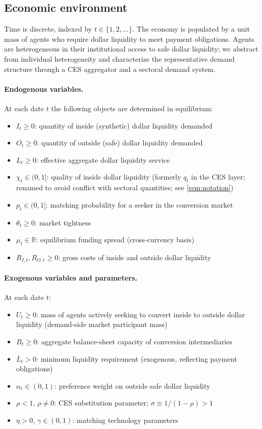 \documentclass[12pt]{article}
\theoremstyle{definition}
\newcommand{\1}[1]{\mathds{1}\left[#1\right]}
\newcommand{\R}{\mathbb{R}}
\begin{document}
\subsection{Economic environment}

Time is discrete, indexed by $t \in \{1, 2, \ldots\}$. The economy is
populated by a unit mass of agents who require dollar liquidity to meet payment
obligations. Agents are heterogeneous in their institutional access to safe
dollar liquidity; we abstract from individual heterogeneity and characterize the
representative demand structure through a CES aggregator and a sectoral demand
system.

\paragraph{Endogenous variables.} At each date $t$ the following objects are
determined in equilibrium:
\begin{itemize}[noitemsep]
  \item $I_t \geq 0$: quantity of inside (synthetic) dollar liquidity demanded
  \item $O_t \geq 0$: quantity of outside (safe) dollar liquidity demanded
  \item $L_t \geq 0$: effective aggregate dollar liquidity service
  \item $\chi_t \in (0,1]$: quality of inside dollar liquidity (formerly $q_t$ in the CES layer; renamed to avoid conflict with sectoral quantities; see \cref{rem:notation})
  \item $p_t \in (0,1]$: matching probability for a seeker in the conversion market
  \item $\theta_t \geq 0$: market tightness
  \item $\mu_t \in \R$: equilibrium funding spread (cross-currency basis)
  \item $R_{I,t}, R_{O,t} \geq 0$: gross costs of inside and outside dollar liquidity
\end{itemize}

\paragraph{Exogenous variables and parameters.} At each date $t$:
\begin{itemize}[noitemsep]
  \item $U_t \geq 0$: mass of agents actively seeking to convert inside to outside
        dollar liquidity (demand-side market participant mass)
  \item $B_t \geq 0$: aggregate balance-sheet capacity of conversion intermediaries
  \item $\bar{L}_t > 0$: minimum liquidity requirement (exogenous, reflecting
        payment obligations)
  \item $\alpha_t \in (0,1)$: preference weight on outside safe dollar liquidity
  \item $\rho < 1$, $\rho \neq 0$: CES substitution parameter; $\sigma \equiv 1/(1-\rho) > 1$
  \item $\eta > 0$, $\gamma \in (0,1)$: matching technology parameters
\end{itemize}
\end{document}
